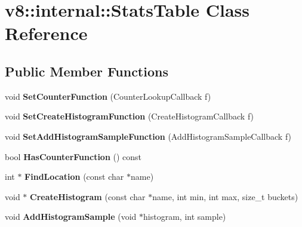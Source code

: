 \hypertarget{classv8_1_1internal_1_1_stats_table}{}\section{v8\+:\+:internal\+:\+:Stats\+Table Class Reference}
\label{classv8_1_1internal_1_1_stats_table}
\subsection*{Public Member Functions}
\begin{DoxyCompactItemize}
\item 
\hypertarget{classv8_1_1internal_1_1_stats_table_a8b3d3e6111d0e6fc92e2c5fac1d7bf63}{}void {\bfseries Set\+Counter\+Function} (Counter\+Lookup\+Callback f)\label{classv8_1_1internal_1_1_stats_table_a8b3d3e6111d0e6fc92e2c5fac1d7bf63}

\item 
\hypertarget{classv8_1_1internal_1_1_stats_table_aed9d933a4c6b5f41a43e53d9d9f6fac8}{}void {\bfseries Set\+Create\+Histogram\+Function} (Create\+Histogram\+Callback f)\label{classv8_1_1internal_1_1_stats_table_aed9d933a4c6b5f41a43e53d9d9f6fac8}

\item 
\hypertarget{classv8_1_1internal_1_1_stats_table_a91179b8d1c0e9f9ec3761ca189925dfb}{}void {\bfseries Set\+Add\+Histogram\+Sample\+Function} (Add\+Histogram\+Sample\+Callback f)\label{classv8_1_1internal_1_1_stats_table_a91179b8d1c0e9f9ec3761ca189925dfb}

\item 
\hypertarget{classv8_1_1internal_1_1_stats_table_a45ba0dee73756de7a975820331e470c4}{}bool {\bfseries Has\+Counter\+Function} () const \label{classv8_1_1internal_1_1_stats_table_a45ba0dee73756de7a975820331e470c4}

\item 
\hypertarget{classv8_1_1internal_1_1_stats_table_a2f44cca1e2acf134a52485e02c79e70c}{}int $\ast$ {\bfseries Find\+Location} (const char $\ast$name)\label{classv8_1_1internal_1_1_stats_table_a2f44cca1e2acf134a52485e02c79e70c}

\item 
\hypertarget{classv8_1_1internal_1_1_stats_table_a0dd8ef255a6791a7132f44b4360ed68b}{}void $\ast$ {\bfseries Create\+Histogram} (const char $\ast$name, int min, int max, size\+\_\+t buckets)\label{classv8_1_1internal_1_1_stats_table_a0dd8ef255a6791a7132f44b4360ed68b}

\item 
\hypertarget{classv8_1_1internal_1_1_stats_table_a225a48909c94185e3a5f7b7f39bb33e1}{}void {\bfseries Add\+Histogram\+Sample} (void $\ast$histogram, int sample)\label{classv8_1_1internal_1_1_stats_table_a225a48909c94185e3a5f7b7f39bb33e1}

\end{DoxyCompactItemize}
